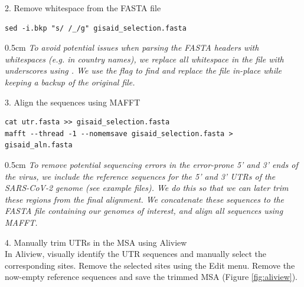 \documentclass{article}
\newcommand{\ann}[1]{
\begin{adjustwidth}{0.5cm}{}
\it{#1}\\
\end{adjustwidth}}
\newcommand{\code}[1]{
{\upshape\ttfamily{#1}}}
\begin{document}
2. Remove whitespace from the FASTA file 
\begin{verbatim}
sed -i.bkp "s/ /_/g" gisaid_selection.fasta 
\end{verbatim}

\ann{To avoid potential issues when parsing the FASTA headers with whitespaces (e.g. in country names), we replace all whitespace in the file with underscores using \code{sed}.  We use the \code{-i} flag to find and replace the file in-place while keeping a backup of the original file.}

3. Align the sequences using MAFFT
\begin{verbatim}
cat utr.fasta >> gisaid_selection.fasta
mafft --thread -1 --nomemsave gisaid_selection.fasta > gisaid_aln.fasta
\end{verbatim}

\ann{To remove potential sequencing errors in the error-prone 5' and 3' ends of the virus, we include the reference sequences for the 5' and 3' UTRs of the SARS-CoV-2 genome (see example files).
We do this so that we can later trim these regions from the final alignment.
We concatenate these sequences to the FASTA file containing our genomes of interest, and align all sequences using MAFFT.} %

4. Manually trim UTRs in the MSA using Aliview\\

In Aliview, visually identify the UTR sequences and manually select the corresponding sites. Remove the selected sites using the Edit menu. %
Remove the now-empty reference sequences and save the trimmed MSA (Figure \ref{fig:aliview}).\\ %
\end{document}
